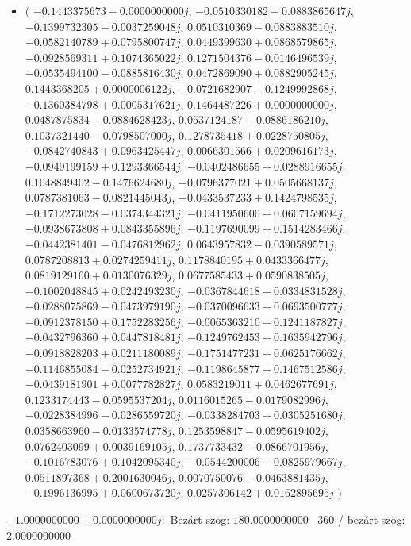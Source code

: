 \documentclass[14pt,a4paper]{article}
\begin{document}
\begin{itemize}
\item
$\big($
$-0.1443375673-0.0000000000j$, $-0.0510330182-0.0883865647j$, $-0.1399732305-0.0037259048j$, $0.0510310369-0.0883883510j$, $-0.0582140789+0.0795800747j$, $0.0449399630+0.0868579865j$, $-0.0928569311+0.1074365022j$, $0.1271504376-0.0146496539j$, $-0.0535494100-0.0885816430j$, $0.0472869090+0.0882905245j$, $0.1443368205+0.0000006122j$, $-0.0721682907-0.1249992868j$, $-0.1360384798+0.0005317621j$, $0.1464487226+0.0000000000j$, $0.0487875834-0.0884628423j$, $0.0537124187-0.0886186210j$, $0.1037321440-0.0798507000j$, $0.1278735418+0.0228750805j$, $-0.0842740843+0.0963425447j$, $0.0066301566+0.0209616173j$, $-0.0949199159+0.1293366544j$, $-0.0402486655-0.0288916655j$, $0.1048849402-0.1476624680j$, $-0.0796377021+0.0505668137j$, $0.0787381063-0.0821445043j$, $-0.0433537233+0.1424798535j$, $-0.1712273028-0.0374344321j$, $-0.0411950600-0.0607159694j$, $-0.0938673808+0.0843355896j$, $-0.1197690099-0.1514283466j$, $-0.0442381401-0.0476812962j$, $0.0643957832-0.0390589571j$, $0.0787208813+0.0274259411j$, $0.1178840195+0.0433366477j$, $0.0819129160+0.0130076329j$, $0.0677585433+0.0590838505j$, $-0.1002048845+0.0242493230j$, $-0.0367844618+0.0334831528j$, $-0.0288075869-0.0473979190j$, $-0.0370096633-0.0693500777j$, $-0.0912378150+0.1752283256j$, $-0.0065363210-0.1241187827j$, $-0.0432796360+0.0447818481j$, $-0.1249762453-0.1635942796j$, $-0.0918828203+0.0211180089j$, $-0.1751477231-0.0625176662j$, $-0.1146855084-0.0252734921j$, $-0.1198645877+0.1467512586j$, $-0.0439181901+0.0077782827j$, $0.0583219011+0.0462677691j$, $0.1233174443-0.0595537204j$, $0.0116015265-0.0179082996j$, $-0.0228384996-0.0286559720j$, $-0.0338284703-0.0305251680j$, $0.0358663960-0.0133574778j$, $0.1253598847-0.0595619402j$, $0.0762403099+0.0039169105j$, $0.1737733432-0.0866701956j$, $-0.1016783076+0.1042095340j$, $-0.0544200006-0.0825979667j$, $0.0511897368+0.2001630046j$, $0.0070750076-0.0463881435j$, $-0.1996136995+0.0600673720j$, $0.0257306142+0.0162895695j$
$\big)$
\end{itemize}
$-1.0000000000+0.0000000000j$:\
Bezárt szög: $180.0000000000$ \
360 / bezárt szög: $2.0000000000$\
\end{document}
